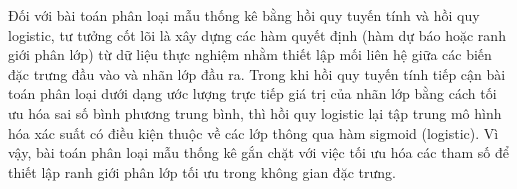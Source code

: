 \hspace*{0.5cm}Đối với bài toán phân loại mẫu thống kê bằng hồi quy tuyến tính và hồi quy logistic, tư tưởng cốt lõi là xây dựng các hàm quyết định (hàm dự báo hoặc ranh giới phân lớp) từ dữ liệu thực nghiệm nhằm thiết lập mối liên hệ giữa các biến đặc trưng đầu vào và nhãn lớp đầu ra. Trong khi hồi quy tuyến tính tiếp cận bài toán phân loại dưới dạng ước lượng trực tiếp giá trị của nhãn lớp bằng cách tối ưu hóa sai số bình phương trung bình, thì hồi quy logistic lại tập trung mô hình hóa xác suất có điều kiện thuộc về các lớp thông qua hàm sigmoid (logistic). Vì vậy, bài toán phân loại mẫu thống kê gắn chặt với việc tối ưu hóa các tham số để thiết lập ranh giới phân lớp tối ưu trong không gian đặc trưng.




